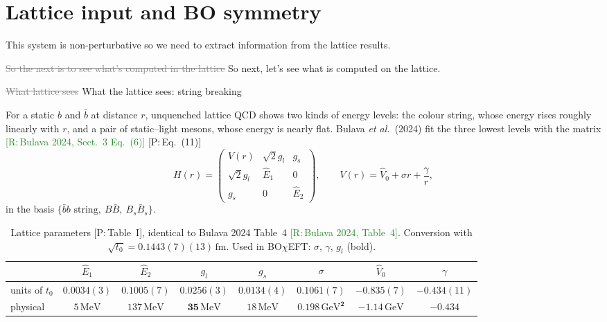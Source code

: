 \documentclass[11pt,a4paper]{article}
\newcommand{\tagP}[1]{\textcolor{blue!65!black}{\textsf{\small[P:\,#1]}}}
\newcommand{\tagR}[1]{\textcolor{ForestGreen}{\textsf{\small[R:\,#1]}}}
\renewcommand{\BOchiEFT}{BO$\chi$EFT}
\renewcommand{\GeV}{\,\mathrm{GeV}}
\renewcommand{\MeV}{\,\mathrm{MeV}}
\newcommand{\fm}{\,\mathrm{fm}}
\newcommand{\aifix}[2]{\textcolor{gray}{\sout{#1}} \textcolor{aicolor}{#2}}
\newcommand{\aifix}[2]{#2}
\begin{document}
\section{Lattice input and BO symmetry}

This system is non-perturbative so we need to extract information from the lattice results.

\aifix{So the next is to see what's computed in the lattice}{So next, let's see what is computed on the lattice.}

\aifix{What lattice sees}{What the lattice sees}: string breaking

For a static $b$ and $\bar b$ at distance $r$, unquenched lattice QCD shows two kinds of energy levels: the colour string, whose energy rises roughly linearly with $r$, and a pair of static--light mesons, whose energy is nearly flat. Bulava \emph{et al.}\ (2024) fit the three lowest levels with the matrix \tagR{Bulava 2024, Sect.~3 Eq.~(6)} \tagP{Eq.~(11)}
\begin{equation}
	H(r)=\begin{pmatrix}V(r)&\sqrt2 g_l&g_s\\ \sqrt2 g_l&\hat E_1&0\\ g_s&0&\hat E_2\end{pmatrix},\qquad V(r)=\hat V_0+\sigma r+\frac{\gamma}{r},
	\label{draft:eq:Hfit}
\end{equation}
in the basis $\{\bar bb\text{ string},\ B\bar B,\ B_s\bar B_s\}$.

\begin{table}[h]
	\centering
	\caption{Lattice parameters \tagP{Table~I}, identical to Bulava 2024 Table~4 \tagR{Bulava 2024, Table~4}. Conversion with $\sqrt{t_0}=0.1443(7)(13)\fm$. Used in \BOchiEFT: $\sigma$, $\gamma$, $g_l$ (bold).}
	\label{draft:tab:lattice}
	\setlength{\tabcolsep}{4pt}\small
	\begin{tabular}{lccccccc}
		\toprule
		               & $\hat E_1$  & $\hat E_2$  & $g_l$         & $g_s$       & $\sigma$           & $\hat V_0$  & $\gamma$      \\
		\midrule
		units of $t_0$ & $0.0034(3)$ & $0.1005(7)$ & $0.0256(3)$   & $0.0134(4)$ & $0.1061(7)$        & $-0.835(7)$ & $-0.434(11)$  \\
		physical       & $5\MeV$     & $137\MeV$   & $\bm{35\MeV}$ & $18\MeV$    & $\bm{0.198\GeV^2}$ & $-1.14\GeV$ & $\bm{-0.434}$ \\
		\bottomrule
	\end{tabular}
\end{table}
\end{document}
